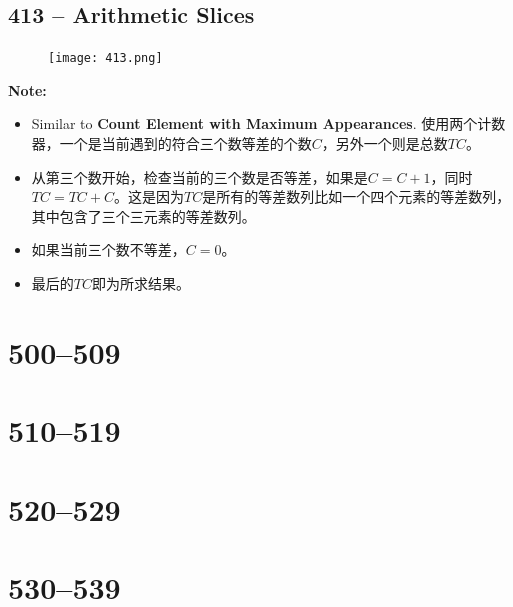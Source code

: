 \documentclass[a4paper,12pt]{article}
\begin{document}
\subsection{413 -- Arithmetic Slices}
	\begin{figure}[H]
	\begin{center}
		\texttt{[image: 413.png]}
	\end{center}
\end{figure}
\textbf{\large{Note:}}
\vspace{1em}
\begin{CJK*}{UTF8}{gbsn}
	\begin{itemize}
		\item Similar to \textbf{Count Element with Maximum Appearances}. 使用两个计数器，一个是当前遇到的符合三个数等差的个数$C$，另外一个则是总数$TC$。
		\item 从第三个数开始，检查当前的三个数是否等差，如果是$C=C+1$，同时$TC=TC+C$。这是因为$TC$是所有的等差数列比如一个四个元素的等差数列，其中包含了三个三元素的等差数列。
		\item 如果当前三个数不等差，$C=0$。
		\item 最后的$TC$即为所求结果。
	\end{itemize}
\end{CJK*}
	
	\section{500--509}
	\section{510--519}
	\section{520--529}
	\section{530--539}
\end{document}
